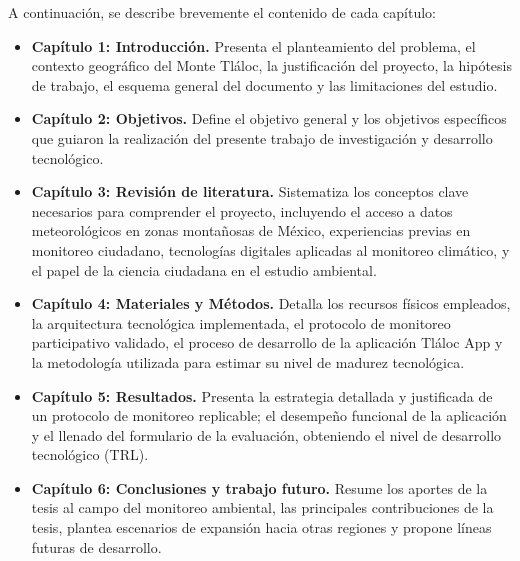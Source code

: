 A continuación, se describe brevemente el contenido de cada capítulo:

\begin{itemize}
    \item \textbf{Capítulo 1: Introducción.} Presenta el planteamiento del problema, el contexto geográfico del Monte Tláloc, la justificación del proyecto, la hipótesis de trabajo, el esquema general del documento y las limitaciones del estudio.
    
    \item \textbf{Capítulo 2: Objetivos.} Define el objetivo general y los objetivos específicos que guiaron la realización del presente trabajo de investigación y desarrollo tecnológico.
    
    \item \textbf{Capítulo 3: Revisión de literatura.} Sistematiza los conceptos clave necesarios para comprender el proyecto, incluyendo el acceso a datos meteorológicos en zonas montañosas de México, experiencias previas en monitoreo ciudadano, tecnologías digitales aplicadas al monitoreo climático, y el papel de la ciencia ciudadana en el estudio ambiental.
    
    \item \textbf{Capítulo 4: Materiales y Métodos.} Detalla los recursos físicos empleados, la arquitectura tecnológica implementada, el protocolo de monitoreo participativo validado, el proceso de desarrollo de la aplicación Tláloc App y la metodología utilizada para estimar su nivel de madurez tecnológica.
    
    \item \textbf{Capítulo 5: Resultados.} Presenta la estrategia detallada y justificada de un protocolo de monitoreo replicable; el desempeño funcional de la aplicación y el llenado del formulario de la evaluación, obteniendo el nivel de desarrollo tecnológico (TRL).
    
    \item \textbf{Capítulo 6: Conclusiones y trabajo futuro.} Resume los aportes de la tesis al campo del monitoreo ambiental, las principales contribuciones de la tesis, plantea escenarios de expansión hacia otras regiones y propone líneas futuras de desarrollo.
\end{itemize}


